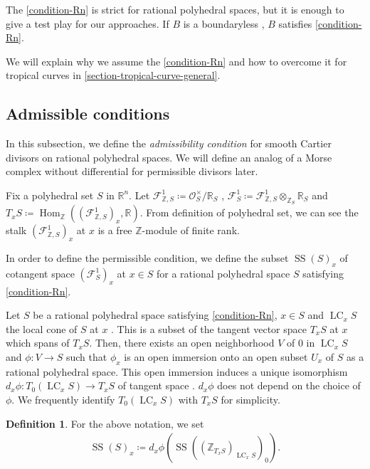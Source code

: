 \documentclass[a4paper,dvipdfmx,reqno,12pt]{amsart}
\theoremstyle{definition}
\newtheorem{definition}[theorem]{Definition}
\newcommand{\deq}{\coloneqq}
\newcommand{\opn}[1]{\operatorname{#1}}
\numberwithin{equation}{section}
\begin{document}
The \cref{condition-Rn} is strict for rational polyhedral
spaces, but it is enough to
give a test play for our approaches.
If $B$ is a boundaryless 
\cite[]{MR4246795}, $B$ 
satisfies \cref{condition-Rn}.

We will explain why we assume the \cref{condition-Rn}
and how to overcome it
for tropical curves in 
\cref{section-tropical-curve-general}.

\subsection{Admissible conditions}

In this subsection, we define 
the \emph{admissibility condition} for
smooth Cartier divisors on rational 
polyhedral spaces.
We will define an analog of a Morse complex
without differential for permissible divisors 
later.

Fix a polyhedral set $S$ 
in $\mathbb{R}^{n}$.
Let 
$\mathcal{F}^{1}_{\mathbb{Z},S}
\deq \mathcal{O}^{\times}_S/\mathbb{R}_{S}$
,
$\mathcal{F}^{1}_{S}\deq 
\mathcal{F}^{1}_{\mathbb{Z},S}
\otimes_{\mathbb{Z}_S} \mathbb{R}_S$ 
and $T_x S\deq \opn{Hom}_{\mathbb{Z}}(
(\mathcal{F}^{1}_{\mathbb{Z},S})_x,\mathbb{R})$.
From definition of polyhedral set, 
we can see 
the stalk $(\mathcal{F}^{1}_{\mathbb{Z},S})_x$
at $x$ is a free 
$\mathbb{Z}$-module of finite rank.

In order to define the permissible condition,
we define the subset $\opn{SS}(S)_x$ of cotangent
space $(\mathcal{F}^{1}_{S})_x$ at $x\in S$ for 
a rational polyhedral
space $S$ satisfying \cref{condition-Rn}.


Let $S$ be a rational polyhedral space satisfying
\cref{condition-Rn}, $x\in S$ and $\opn{LC}_x S$ the 
local cone of $S$ at $x$ 
\cite[2.2]{gross2019sheaftheoretic}.
This is a subset of the tangent vector space
$T_{x}S$ at $x$ which spans of $T_{x}S$.
Then, there exists an open neighborhood 
$V$ of $0$ in $\opn{LC}_x S$ and $\phi \colon V\to S$ 
such that $\phi_x$ is an open immersion onto an 
open subset $U_x$ of $S$ as a 
rational polyhedral space.
This open immersion induces a unique isomorphism
$d_x\phi\colon T_0(\opn{LC}_xS) \to T_x S$
of tangent space 
\cite[Proposition 2.5]{gross2019sheaftheoretic}.
$d_x \phi$ does not depend on the choice of 
$\phi$. We frequently identify $T_0(\opn{LC}_x S)$ with 
$T_x S$ for simplicity.
\begin{definition}
For the above notation, we set
\begin{align}
\opn{SS}(S)_x\deq 
d_x\phi(\opn{SS}((\mathbb{Z}_{T_x S})_{\opn{LC}_x S})_0).
\end{align}

\end{definition}
\end{document}

